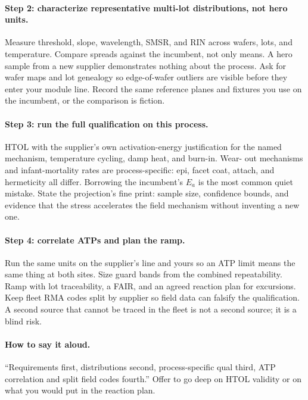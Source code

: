 \paragraph{Step 2: characterize representative multi-lot distributions, not hero
units.}
Measure threshold, slope, wavelength, SMSR, and RIN across
wafers, lots, and temperature. Compare spreads against the incumbent, not
only means. A hero sample from a new supplier demonstrates nothing about the
process. Ask for wafer maps and lot genealogy so edge-of-wafer outliers are
visible before they enter your module line. Record the same reference planes
and fixtures you use on the incumbent, or the comparison is fiction.

\paragraph{Step 3: run the full qualification on this process.}
HTOL with the supplier's own activation-energy justification
for the named mechanism, temperature cycling, damp heat, and burn-in. Wear-
out mechanisms and infant-mortality rates are process-specific: epi, facet
coat, attach, and hermeticity all differ. Borrowing the incumbent's $E_a$ is
the most common quiet mistake. State the projection's fine print: sample
size, confidence bounds, and evidence that the stress accelerates the field
mechanism without inventing a new one.

\paragraph{Step 4: correlate ATPs and plan the ramp.}
Run the same units on the supplier's line and yours so an ATP
limit means the same thing at both sites. Size guard bands from the combined
repeatability. Ramp with lot traceability, a FAIR, and an
agreed reaction plan for excursions. Keep fleet RMA codes
split by supplier so field data can falsify the qualification. A second
source that cannot be traced in the fleet is not a second source; it is a
blind risk.

\paragraph{How to say it aloud.}
``Requirements first, distributions second, process-specific qual third, ATP
correlation and split field codes fourth.'' Offer to go deep on HTOL validity
or on what you would put in the reaction plan.


